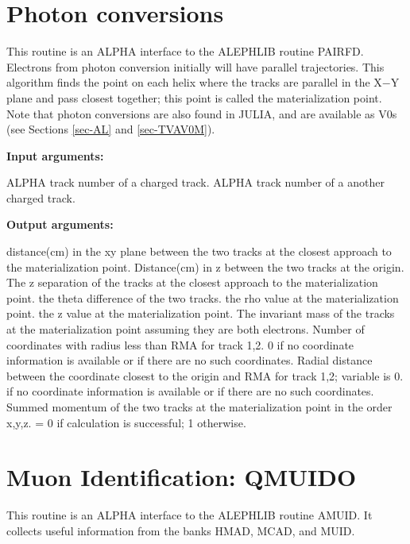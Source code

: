 \section{\label{sec-OARPAIR}Photon conversions}
\par
{}
\par
This routine is an ALPHA interface to the ALEPHLIB routine PAIRFD.
Electrons from photon conversion initially will have parallel
trajectories. This algorithm
finds the point on each helix where the tracks are
parallel in the X$-$Y plane and pass closest together; this point
is called the materialization point.
Note that photon conversions are also found in JULIA, and are available
as V0s (see Sections \ref{sec-AL} and \ref{sec-TVAV0M}).
\par
{\bf Input arguments:}
\begin{indentlist}{ 3.50cm}{ 3.75cm}
ALPHA track number of a charged track.
ALPHA track number of a another charged track.
\end{indentlist}
 
{\bf Output arguments:}
\begin{indentlist}{ 3.50cm}{ 3.75cm}
distance(cm) in the xy plane between the two tracks
at the closest approach to the materialization point.
Distance(cm) in z between the two tracks at the origin.
The z separation of the tracks at the
closest approach to
the materialization point.
the theta difference of the two tracks.
the rho value at the materialization point.
the z value at the materialization point.
The invariant mass of the tracks at the materialization
point assuming they are both electrons.
Number of coordinates with radius less than RMA
for
track 1,2.  0 if no coordinate information is available or
if there are no such coordinates.
Radial distance between the coordinate closest
to
the origin and RMA for track 1,2;
variable is 0. if no coordinate
information is available or if there are no such coordinates.
Summed momentum of the two tracks at the materialization
point in the order x,y,z.
 = 0 if calculation is successful; 1 otherwise.
\end{indentlist}
\par
\section{\label{sec-OARMUID}Muon Identification: QMUIDO}
\par
{}
\par
This routine is an ALPHA interface to the ALEPHLIB routine
AMUID.
It collects useful information from the banks
HMAD, MCAD, and MUID. 

